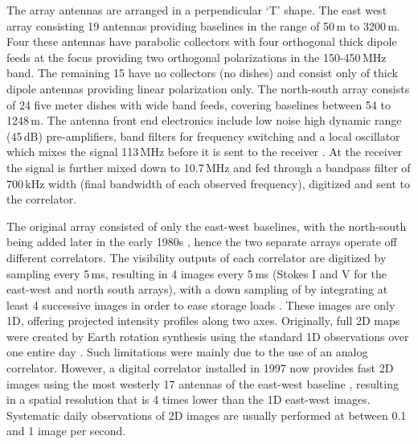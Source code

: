 The array antennas are arranged in a perpendicular \textquoteleft T' shape. The east west array consisting 19 antennas providing baselines in the range of 50\,m to 3200\,m. Four these antennas have parabolic collectors with four orthogonal thick dipole feeds at the focus providing two orthogonal polarizations in the 150-450\,MHz band. The remaining 15 have no collectors (no dishes) and consist only of thick dipole antennas providing linear polarization only. The north-south array consists of 24 five meter dishes with wide band feeds, covering baselines between 54 to 1248\,m. The antenna front end electronics include low noise high dynamic range (45\,dB) pre-amplifiers, band filters for frequency switching and a local oscillator which mixes the signal 113\,MHz before it is sent to the receiver \citep{avignon1989}. At the receiver the signal is further mixed down to 10.7\,MHz and fed through a bandpass filter of 700\,kHz width (final bandwidth of each observed frequency), digitized and sent to the correlator.


The original array consisted of only the east-west baselines, with the north-south being added later in the early 1980s \citep{bonmartin1983}, hence the two separate arrays operate off different correlators. The visibility outputs of each correlator are digitized by sampling every 5\,ms, resulting in 4 images every 5\,ms (Stokes I and V for the east-west and north south arrays), with a down sampling of by integrating at least 4 successive images in order to ease storage loads \citep{avignon1989}. These images are only 1D, offering projected intensity profiles along two axes. Originally, full 2D maps were created by Earth rotation synthesis using the standard 1D observations over one entire day \citep{nrh1993}. Such limitations were mainly due to the use of an analog correlator. However, a digital correlator installed in 1997 now provides fast 2D images using the most westerly 17 antennas of the east-west baseline \citep{kerdraon1997}, resulting in a spatial resolution that is 4 times lower than the 1D east-west images. Systematic daily observations of 2D images are usually performed at between 0.1 and 1 image per second.

